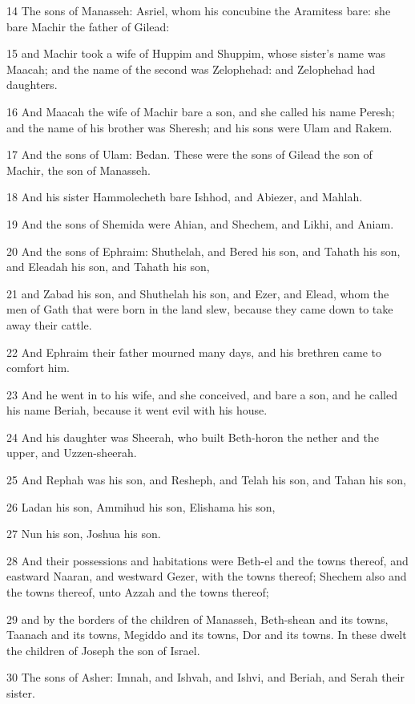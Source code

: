 \par 14 The sons of Manasseh: Asriel, whom his concubine the Aramitess bare: she bare Machir the father of Gilead:
\par 15 and Machir took a wife of Huppim and Shuppim, whose sister's name was Maacah; and the name of the second was Zelophehad: and Zelophehad had daughters.
\par 16 And Maacah the wife of Machir bare a son, and she called his name Peresh; and the name of his brother was Sheresh; and his sons were Ulam and Rakem.
\par 17 And the sons of Ulam: Bedan. These were the sons of Gilead the son of Machir, the son of Manasseh.
\par 18 And his sister Hammolecheth bare Ishhod, and Abiezer, and Mahlah.
\par 19 And the sons of Shemida were Ahian, and Shechem, and Likhi, and Aniam.
\par 20 And the sons of Ephraim: Shuthelah, and Bered his son, and Tahath his son, and Eleadah his son, and Tahath his son,
\par 21 and Zabad his son, and Shuthelah his son, and Ezer, and Elead, whom the men of Gath that were born in the land slew, because they came down to take away their cattle.
\par 22 And Ephraim their father mourned many days, and his brethren came to comfort him.
\par 23 And he went in to his wife, and she conceived, and bare a son, and he called his name Beriah, because it went evil with his house.
\par 24 And his daughter was Sheerah, who built Beth-horon the nether and the upper, and Uzzen-sheerah.
\par 25 And Rephah was his son, and Resheph, and Telah his son, and Tahan his son,
\par 26 Ladan his son, Ammihud his son, Elishama his son,
\par 27 Nun his son, Joshua his son.
\par 28 And their possessions and habitations were Beth-el and the towns thereof, and eastward Naaran, and westward Gezer, with the towns thereof; Shechem also and the towns thereof, unto Azzah and the towns thereof;
\par 29 and by the borders of the children of Manasseh, Beth-shean and its towns, Taanach and its towns, Megiddo and its towns, Dor and its towns. In these dwelt the children of Joseph the son of Israel.
\par 30 The sons of Asher: Imnah, and Ishvah, and Ishvi, and Beriah, and Serah their sister.
